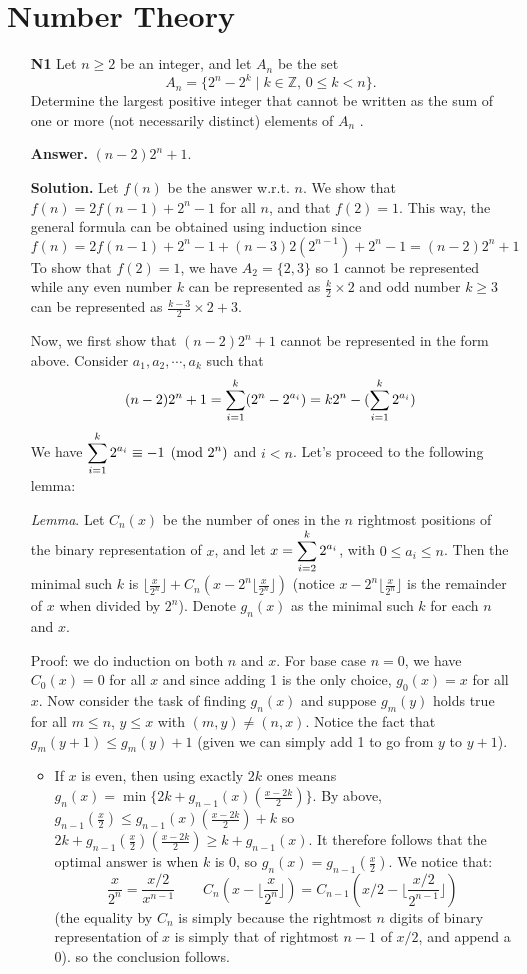 \documentclass[11pt,a4paper]{article}
\begin{document}
\section*{Number Theory}
\begin{enumerate}
	\item [\textbf{N1}] Let $n \ge 2$ be an integer, and let $A_n$ be the set \[A_n = \{2^n  - 2^k\mid k \in \mathbb{Z},\, 0 \le k < n\}.\] Determine the largest positive integer that cannot be written as the sum of one or more (not necessarily distinct) elements of $A_n$ .
	
	\textbf{Answer.} $(n-2)2^n+1$. 
	
	\textbf{Solution.} Let $f(n)$ be the answer w.r.t. $n$. We show that $f(n)=2f(n-1)+2^n-1$ for all $n$, and that $f(2)=1$. This way, the general formula can be obtained using induction since
	\[
	f(n)=2f(n-1)+2^n-1 + (n-3)2(2^{n-1})+2^n-1 = (n-2)2^n+1
	\]
	To show that $f(2)=1$, we have $A_2=\{2, 3\}$ so 1 cannot be represented while any even number $k$ can be represented as $\frac{k}{2}\times 2$ and odd number $k\ge 3$ can be represented as $\frac{k-3}{2}\times 2 + 3$. 
	
	Now, we first show that $(n-2)2^n+1$ cannot be represented in the form above. Consider $a_1, a_2, \cdots , a_k$ such that 
	\[
	(n-2)2^n+1 = \displaystyle\sum_{i=1}^k (2^n-2^{a_i}) = k2^n-(\displaystyle\sum_{i=1}^k 2^{a_i})
	\]
	We have $\displaystyle\sum_{i=1}^k 2^{a_i}\equiv -1\pmod{2^n}$ and $i< n$. 
	Let's proceed to the following lemma: 
	
	\emph{Lemma}. Let $C_n(x)$ be the number of ones in the $n$ rightmost positions of the binary representation of $x$, and let $x=\displaystyle\sum_{i=2}^k 2^{a_i}$, with $0\le a_i \le n$. Then the minimal such $k$ is $ \lfloor \frac{x}{2^{n}}\rfloor + C_{n}(x-2^{n}\lfloor \frac{x}{2^{n}}\rfloor)$ (notice $x-2^{n}\lfloor \frac{x}{2^{n}}\rfloor$ is the remainder of $x$ when divided by $2^{n}$). Denote $g_n(x)$ as the minimal such $k$ for each $n$ and $x$. 
	
	Proof: we do induction on both $n$ and $x$. For base case $n=0$, we have $C_0(x)=0$ for all $x$ and since adding 1 is the only choice, $g_0(x)=x$ for all $x$. Now consider the task of finding $g_n(x)$ and suppose $g_m(y)$ holds true for all $m\le n$, $y\le x$ with $(m, y)\neq (n, x)$. Notice the fact that $g_m(y+1)\le g_m(y)+1$ (given we can simply add 1 to go from $y$ to $y+1$). 
	\begin{itemize}
		\item If $x$ is even, then using exactly $2k$ ones means $g_n(x)=\min\{2k+g_{n-1}(x)(\frac{x-2k}{2})\}$. By above, $g_{n-1}(\frac{x}{2})\le g_{n-1}(x)(\frac{x-2k}{2})+k$ so $2k+g_{n-1}(\frac{x}{2})(\frac{x-2k}{2})\ge k+g_{n-1}(x)$. It therefore follows that the optimal answer is when $k$ is 0, so $g_{n}(x)=g_{n-1}(\frac{x}{2})$. We notice that: 
		\[
		\frac{x}{2^{n}} = \frac{x/2}{x^{n-1}}\qquad C_{n}(x-\lfloor\frac{x}{2^{n}}\rfloor)=C_{n-1}(x/2-\lfloor\frac{x/2}{2^{n-1}}\rfloor)
		\]
		(the equality by $C_n$ is simply because the rightmost $n$ digits of binary representation of $x$ is simply that of rightmost $n-1$ of $x/2$, and append a 0). 
		so the conclusion follows. 
		

\end{itemize}
\end{enumerate}
\end{document}
